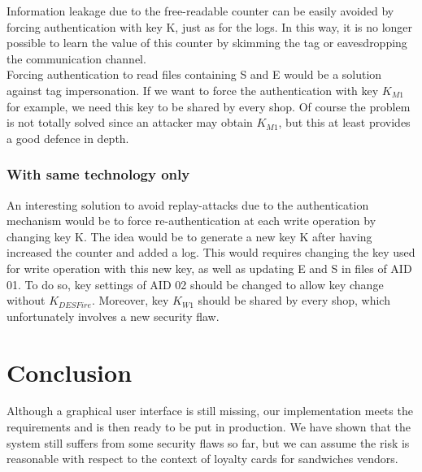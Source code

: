 \documentclass[a4paper,11pt,oneside]{article}
\begin{document}
Information leakage due to the free-readable counter can be easily avoided by forcing authentication with key K, just as for the logs. In this way, it is no longer possible to learn the value of this counter by skimming the tag or eavesdropping the communication channel. \\

Forcing authentication to read files containing S and E would be a solution against tag impersonation. If we want to force the authentication with key $K_{M1}$ for example, we need this key to be shared by every shop. Of course the problem is not totally solved since an attacker may obtain $K_{M1}$, but this at least provides a good defence in depth. \\


\subsubsection{With same technology only}

An interesting solution to avoid replay-attacks due to the authentication mechanism would be to force re-authentication at each write operation by changing key K. The idea would be to generate a new key K after having increased the counter and added a log. This would requires changing the key used for write operation with this new key, as well as updating E and S in files of AID 01. To do so, key settings of AID 02 should be changed to allow key change without $K_{DESFire}$. Moreover, key $K_{W1}$ should be shared by every shop, which unfortunately involves a new security flaw. \\

\section{Conclusion}

Although a graphical user interface is still missing, our implementation meets the requirements and is then ready to be put in production. We have shown that the system  still suffers from some security flaws so far, but we can assume the risk is reasonable with respect to the context of loyalty cards for sandwiches vendors. \\
\end{document}
